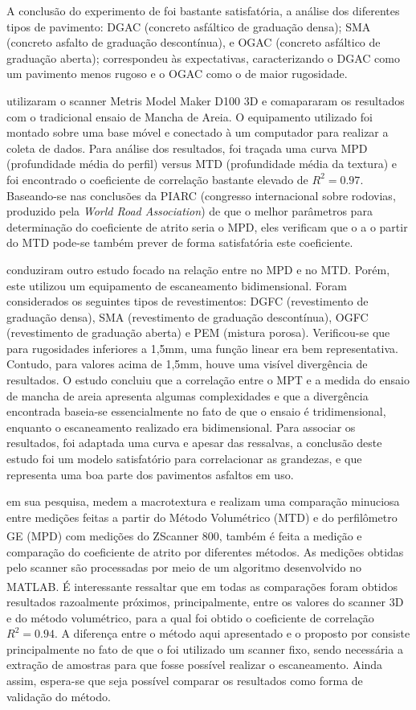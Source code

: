 A conclusão do experimento de  foi bastante satisfatória, a análise dos diferentes tipos de pavimento: DGAC (concreto asfáltico de graduação densa); SMA (concreto asfalto de graduação descontínua), e OGAC (concreto asfáltico de graduação aberta); correspondeu às expectativas, caracterizando o DGAC como um pavimento menos rugoso e o OGAC como o de maior rugosidade.

 utilizaram o scanner Metris Model Maker D100 3D e comapararam os resultados com o tradicional ensaio de Mancha de Areia. O equipamento utilizado foi montado sobre uma base móvel e conectado à um computador para realizar a coleta de dados. Para análise dos resultados, foi traçada uma curva MPD (profundidade média do perfil) versus MTD (profundidade média da textura) e foi encontrado o coeficiente de correlação bastante elevado de $R^2 = 0.97$. Baseando-se nas conclusões da PIARC (congresso internacional sobre rodovias, produzido pela \emph{World Road Association}) de que o melhor parâmetros para determinação do coeficiente de atrito seria o MPD,  eles verificam que o a o partir do MTD pode-se também prever de forma satisfatória este coeficiente.

 conduziram outro estudo focado na relação entre no MPD e no MTD. Porém, este utilizou um equipamento de escaneamento bidimensional. Foram considerados os seguintes tipos de revestimentos: DGFC (revestimento de graduação densa), SMA (revestimento de graduação descontínua), OGFC (revestimento de graduação aberta) e PEM (mistura porosa). Verificou-se que para rugosidades inferiores a 1,5mm, uma função linear era bem representativa. Contudo, para valores acima de 1,5mm, houve uma visível divergência de resultados. O estudo concluiu que a correlação entre o MPT e a medida do ensaio de mancha de areia apresenta algumas complexidades e que a divergência encontrada baseia-se essencialmente no fato de que o ensaio é tridimensional, enquanto o escaneamento realizado era bidimensional. Para associar os resultados, foi adaptada uma curva e apesar das ressalvas, a conclusão deste estudo foi um modelo satisfatório para correlacionar as grandezas, e que representa uma boa parte dos pavimentos asfaltos em uso.

 em sua pesquisa, medem a macrotextura e realizam uma comparação minuciosa entre medições feitas a partir do Método Volumétrico (MTD) e do perfilômetro GE (MPD) com medições do ZScanner\textsuperscript{\textregistered} 800, também é feita a medição e comparação do coeficiente de atrito por diferentes métodos. As medições obtidas pelo scanner são processadas por meio de um algoritmo desenvolvido no MATLAB\textsuperscript{\textregistered}. É interessante ressaltar que em todas as comparações foram obtidos resultados razoalmente próximos, principalmente, entre os valores do scanner 3D e do método volumétrico, para a qual foi obtido o coeficiente de correlação $R^2 = 0.94$. A diferença entre o método aqui apresentado e o proposto por  consiste principalmente no fato de que o foi utilizado um scanner fixo, sendo necessária a extração de amostras para que fosse possível realizar o escaneamento. Ainda assim, espera-se que seja possível comparar os resultados como forma de validação do método.  

